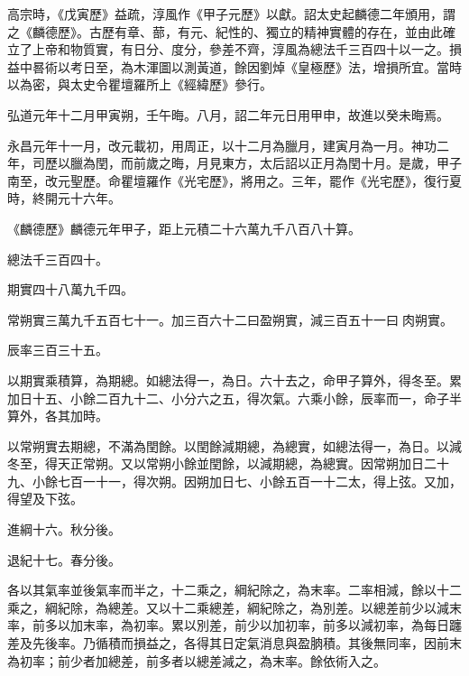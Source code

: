 
\begin{pinyinscope}

 高宗時，《戊寅歷》益疏，淳風作《甲子元歷》以獻。詔太史起麟德二年頒用，謂之《麟德歷》。古歷有章、蔀，有元、紀性的、獨立的精神實體的存在，並由此確立了上帝和物質實，有日分、度分，參差不齊，淳風為總法千三百四十以一之。損益中晷術以考日至，為木渾圖以測黃道，餘因劉焯《皇極歷》法，增損所宜。當時以為密，與太史令瞿壇羅所上《經緯歷》參行。



 弘道元年十二月甲寅朔，壬午晦。八月，詔二年元日用甲申，故進以癸未晦焉。



 永昌元年十一月，改元載初，用周正，以十二月為臘月，建寅月為一月。神功二年，司歷以臘為閏，而前歲之晦，月見東方，太后詔以正月為閏十月。是歲，甲子南至，改元聖歷。命瞿壇羅作《光宅歷》，將用之。三年，罷作《光宅歷》，復行夏時，終開元十六年。



 《麟德歷》麟德元年甲子，距上元積二十六萬九千八百八十算。



 總法千三百四十。



 期實四十八萬九千四。



 常朔實三萬九千五百七十一。加三百六十二曰盈朔實，減三百五十一曰肉朔實。



 辰率三百三十五。



 以期實乘積算，為期總。如總法得一，為日。六十去之，命甲子算外，得冬至。累加日十五、小餘二百九十二、小分六之五，得次氣。六乘小餘，辰率而一，命子半算外，各其加時。



 以常朔實去期總，不滿為閏餘。以閏餘減期總，為總實，如總法得一，為日。以減冬至，得天正常朔。又以常朔小餘並閏餘，以減期總，為總實。因常朔加日二十九、小餘七百一十一，得次朔。因朔加日七、小餘五百一十二太，得上弦。又加，得望及下弦。



 進綱十六。秋分後。



 退紀十七。春分後。



 各以其氣率並後氣率而半之，十二乘之，綱紀除之，為末率。二率相減，餘以十二乘之，綱紀除，為總差。又以十二乘總差，綱紀除之，為別差。以總差前少以減末率，前多以加末率，為初率。累以別差，前少以加初率，前多以減初率，為每日躔差及先後率。乃循積而損益之，各得其日定氣消息與盈朒積。其後無同率，因前末為初率；前少者加總差，前多者以總差減之，為末率。餘依術入之。




\end{pinyinscope}

